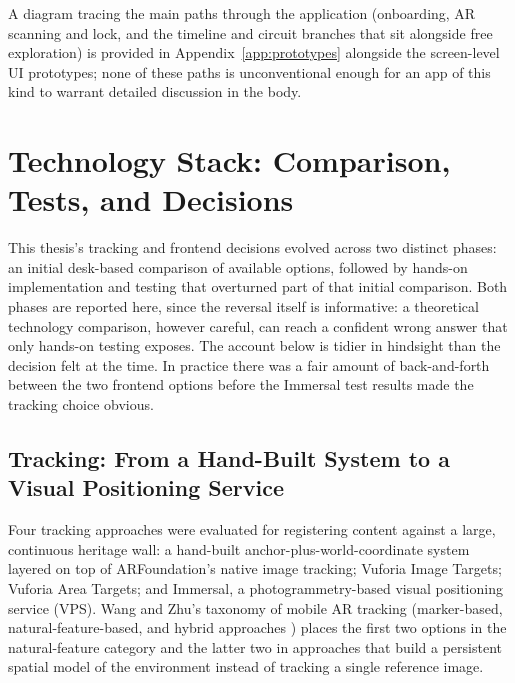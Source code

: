 \begin{aitemize}[nosep]
A diagram tracing the main paths through the application (onboarding, AR scanning and lock, and the timeline and circuit branches that sit alongside free exploration) is provided in
Appendix~\ref{app:prototypes} alongside the screen-level UI prototypes;
none of these paths is unconventional enough for an app of this kind to
warrant detailed discussion in the body.

\section{Technology Stack: Comparison, Tests, and Decisions}
\label{sec:pw-techstack}
 
This thesis's tracking and frontend decisions evolved across two distinct
phases: an initial desk-based comparison of available options, followed
by hands-on implementation and testing that overturned part of that
initial comparison. Both phases are reported here, since the reversal
itself is informative: a theoretical technology comparison, however
careful, can reach a confident wrong answer that only hands-on testing
exposes. The account below is tidier in
hindsight than the decision felt at the time. In practice there was a fair amount of back-and-forth between the two frontend
options before the Immersal test results made the tracking choice obvious.
 
\subsection*{Tracking: From a Hand-Built System to a Visual Positioning Service}
 
Four tracking approaches were evaluated for registering content against a
large, continuous heritage wall: a hand-built anchor-plus-world-coordinate
system layered on top of ARFoundation's native image tracking; Vuforia
Image Targets; Vuforia Area Targets; and Immersal, a photogrammetry-based
visual positioning service (VPS). Wang and Zhu's taxonomy of mobile AR
tracking (marker-based, natural-feature-based, and hybrid approaches \cite{wangzhu2022}) places the first two options in the natural-feature
category and the latter two in approaches that build a persistent spatial
model of the environment instead of tracking a single reference image.
 

\end{aitemize}
